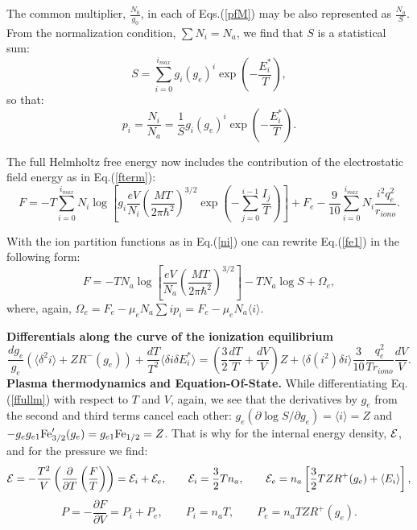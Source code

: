 \documentclass[english,12pt]{revtex4}
\begin{document}
The common multiplier, $\frac{N_0}{g_0}$, in each of Eqs.(\ref{pfM}) may be also represented as $\frac{N_a}{S}$.
From the normalization condition, $\sum N_i = N_a$, we find that $S$ is a statistical sum:
\begin{equation}
S=\sum_{i=0}^{i_{max}} g_i (g_e)^i \exp\left(-\frac{E_i^*}T\right),
\end{equation}
so that:
\begin{equation}\label{ni}
p_i = \frac{N_i}{N_a} = \frac{1}S g_i (g_e)^i \exp \left( -\frac{E_i^*}T \right).
\end{equation}

The full Helmholtz free energy now includes the contribution of the electrostatic field energy as in Eq.(\ref{fterm}):
\begin{equation}\label{fe1}
F=-T
\sum_{i=0}^{i_{max}}{
N_i\log\left[g_i
  \frac{eV}{N_i}\left(\frac{MT}{2\pi \hbar^2}\right)^{3/2}\exp \left(-\sum_{j=0}^{i-1}\frac{I_j}T \right)\right]}+F_e
  -\frac{9}{10} \sum_{i=0}^{i_{max}} N_i \frac{i^2 q_e^2}{r_{iono}}.
\end{equation}  

With the ion partition functions as in Eq.(\ref{ni}) one can rewrite Eq.(\ref{fe1}) in the following form:
\begin{equation}\label{ffullm}
F = -TN_a\log\left[\frac{eV}{N_a}\left(\frac{MT}{2\pi \hbar^2}\right)^{3/2}\right]-TN_a\log S + \Omega_e, 
\end{equation}
where, again, $\Omega_e = F_e - \mu_e N_a \sum i p_i = F_e - \mu_e N_a \langle i \rangle $.

{\bf Differentials along the curve of the ionization equilibrium}
\begin{equation}
\frac{dg_e}{g_e} (\langle \delta^2 i \rangle + ZR^-(g_e)) + \frac{dT}{T^2} \langle \delta i \delta E_i^* \rangle =
\left(\frac32 \frac{dT}T + \frac{dV}V\right) Z + \langle \delta(i^2) \delta i \rangle \frac{3}{10} \frac{q_e^2}{Tr_{iono}}
\frac{dV}{V}.
\end{equation}
{\bf Plasma thermodynamics and Equation-Of-State.} 
While differentiating Eq.(\ref{ffullm}) with respect to $T$ and $V$, again, we see that the derivatives
by $g_e$ from the second and third terms cancel 
each other: $g_e(\partial \log S/\partial g_e)=\langle i\rangle=Z$ and $-g_eg_{e1}{\rm Fe}^\prime_{3/2}(g_e)=g_{e1}{\rm Fe}_{1/2}=Z$. That is why for the internal energy density, 
${\cal E}$, and for the pressure we find:
\begin{equation}
{\cal E} = -\frac{T^2}V\left(\frac{\partial}{\partial T}\left(\frac F T\right)\right)=
{\cal E}_i+{\cal E}_e,\qquad{\cal E}_i=\frac32Tn_a,
\qquad{\cal E}_e=n_a\left[\frac32TZR^+(g_e)+\langle E_i\rangle\right],
\end{equation}
\begin{equation}
P = -\frac{\partial F}{\partial V}=P_i+P_e,\qquad
P_i = n_aT,\qquad
P_e = n_aTZR^+(g_e).
\end{equation}
\end{document}
